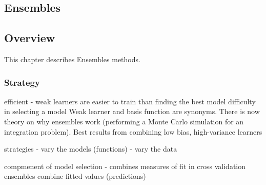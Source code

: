

\renewcommand{\bibsection}{\subsection{\bibname}}
\begin{bibunit}

\chapter{Ensembles}
\label{ch:ensembles}

\section{Overview}
This chapter describes Ensembles methods.


\subsection{Strategy}


efficient - weak learners are easier to train than finding the best model
difficulty in selecting a model
Weak learner and basis function are synonyms.
There is now theory on why ensembles work (performing a Monte Carlo simulation for an integration problem).
Best results from combining low bias, high-variance learners

strategies
- vary the models (functions)
- vary the data

compmenent of model selection - combines measures of fit in cross validation
ensembles combine fitted values (predictions)



\end{bibunit}
